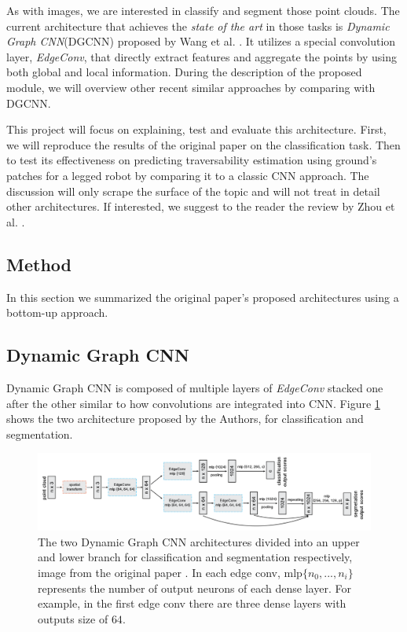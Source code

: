 \documentclass[twocolumn,showpacs,
  nofootinbib,aps,superscriptaddress,
  eqsecnum,prd,notitlepage,showkeys,10pt]{revtex4-1}
\begin{document}
As with images, we are interested in classify and segment those point clouds. The current architecture that achieves the \emph{state of the art} in those tasks is \emph{Dynamic Graph CNN}(DGCNN) proposed by Wang et al. \cite{dgcnn}. It utilizes a special convolution layer,  \emph{EdgeConv}, that directly extract features and aggregate the points by using both global and local information. During the description of the proposed module, we will overview other recent similar approaches by comparing with DGCNN.

This project will focus on explaining, test and evaluate this architecture. First, we will reproduce the results of the original paper on the classification task. Then to test its effectiveness on predicting traversability estimation using ground's patches for a legged robot by comparing it to a classic CNN approach. The discussion will only scrape the surface of the topic and will not treat in detail other architectures. If interested, we suggest to the reader the review by Zhou et al. \cite{1812.08434}.
\subsection{Method}
In this section we summarized the original paper's proposed architectures using a bottom-up approach.
\subsection{Dynamic Graph CNN}
Dynamic Graph CNN is composed of multiple layers of \emph{EdgeConv} stacked one after the other similar to how convolutions are integrated into CNN. Figure \ref{fig : DGCNN} shows the two architecture proposed by the Authors, for classification and segmentation. 
\begin{figure}
  \centering
  \includegraphics[width=\linewidth]{images/DGCNN.png}
\caption{The two Dynamic Graph CNN architectures divided into an upper and lower branch for classification and segmentation respectively, image from the original paper \cite{dgcnn}. In each edge conv, mlp$\{n_0, ..., n_{i}\}$ represents the number of output neurons of each dense layer. For example, in the first edge conv there are three dense layers with outputs size of $64$.}
\label{fig : DGCNN}
\end{figure}
\end{document}
